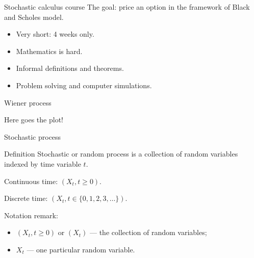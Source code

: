 
\begin{frame} %


\end{frame}


\begin{frame}{Stochastic calculus course}
  The goal: price an option in the framework of Black and Scholes model. 

  \begin{itemize}[<+->]
    \item Very short: \alert{4 weeks} only.
    \item Mathematics is \alert{hard}.
    \item \alert{Informal} definitions and theorems. 
    \item \alert{Problem solving} and computer \alert{simulations}. 
  \end{itemize}

\end{frame}


\begin{frame}{Wiener process}

  Here goes the plot!

\end{frame}


\begin{frame}{Stochastic process}

  \begin{block}{Definition}
    \alert{Stochastic} or \alert{random process} is a collection of random variables indexed by time variable $t$. 
    \pause

    \alert{Continuous time}: $(X_t, t\geq 0)$.
    \pause 
    
    \alert{Discrete time}: $(X_t, t\in \{0, 1, 2, 3, \ldots \})$. 
\end{block}

\pause 
Notation remark:
\begin{itemize}[<+->]
  \item $(X_t, t\geq 0)$ or $(X_t)$ — the collection of random variables;
  \item $X_t$ — one particular random variable. 
\end{itemize}


\end{frame}

